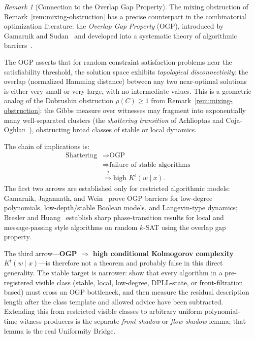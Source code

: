 \documentclass[aps,prd,twocolumn,superscriptaddress,nofootinbib]{revtex4-2}
\theoremstyle{definition}
\theoremstyle{remark}
\newtheorem{remark}[theorem]{Remark}
\begin{document}
\begin{remark}[Connection to the Overlap Gap Property]
\label{rem:ogp-connection}
The mixing obstruction of Remark~\ref{rem:mixing-obstruction} has a precise counterpart in the combinatorial optimization literature: the \emph{Overlap Gap Property} (OGP), introduced by Gamarnik and Sudan~\cite{GamarnikSudan2017} and developed into a systematic theory of algorithmic barriers~\cite{Gamarnik2021}.

The OGP asserts that for random constraint satisfaction problems near the satisfiability threshold, the solution space exhibits \emph{topological disconnectivity}: the overlap (normalized Hamming distance) between any two near-optimal solutions is either very small or very large, with no intermediate values. This is a geometric analog of the Dobrushin obstruction $\rho(C) \geq 1$ from Remark~\ref{rem:mixing-obstruction}: the Gibbs measure over witnesses may fragment into exponentially many well-separated clusters (the \emph{shattering transition} of Achlioptas and Coja-Oghlan~\cite{AchlioptasCO2008}), obstructing broad classes of stable or local dynamics.

The chain of implications is:
\[
\begin{aligned}
\text{Shattering}
&\Rightarrow \text{OGP}\\
&\Rightarrow \text{failure of stable algorithms}\\
&\stackrel{?}{\Rightarrow} \text{high } K^t(w \mid x).
\end{aligned}
\]
The first two arrows are established only for restricted algorithmic models: Gamarnik, Jagannath, and Wein~\cite{GamarnikJW2020} prove OGP barriers for low-degree polynomials, low-depth/stable Boolean models, and Langevin-type dynamics; Bresler and Huang~\cite{BreslerHuang2022} establish sharp phase-transition results for local and message-passing style algorithms on random $k$-SAT using the overlap gap property.

The third arrow---\textbf{OGP $\Rightarrow$ high conditional Kolmogorov complexity $K^t(w \mid x)$}---is therefore not a theorem and probably false in this direct generality. The viable target is narrower: show that every algorithm in a pre-registered visible class (stable, local, low-degree, DPLL-state, or front-filtration based) must cross an OGP bottleneck, and then measure the residual description length after the class template and allowed advice have been subtracted. Extending this from restricted visible classes to arbitrary uniform polynomial-time witness producers is the separate \emph{front-shadow} or \emph{flow-shadow} lemma; that lemma is the real Uniformity Bridge.


\end{remark}
\end{document}
